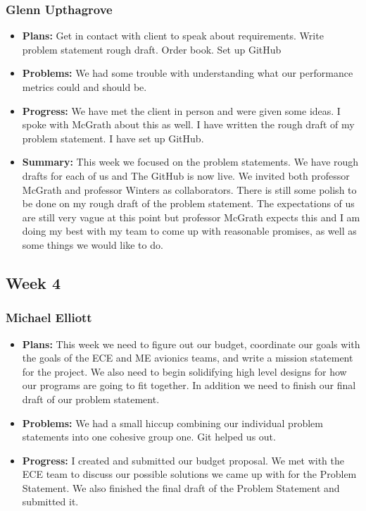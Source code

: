 \documentclass[onecolumn, draftclsnofoot,10pt, compsoc]{IEEEtran}
\begin{document}
\subsubsection{Glenn Upthagrove}
\begin {itemize}
 \item \textbf{Plans: }Get in contact with client to speak about requirements. Write problem statement rough draft. Order book. Set up GitHub
 \item \textbf{Problems: }We had some trouble with understanding what our performance metrics could and should be. 
 \item \textbf{Progress: }We have met the client in person and were given some ideas. I spoke with McGrath about this as well. I have written the rough draft of my problem statement. I have set up GitHub. 
 \item \textbf{Summary: }This week we focused on the problem statements. We have rough drafts for each of us and The GitHub is now live. We invited both professor McGrath and professor Winters as collaborators. There is still some polish to be done on my rough draft of the problem statement. The expectations of us are still very vague at this point but professor McGrath expects this and I am doing my best with my team to come up with reasonable promises, as well as some things we would like to do. 
\end {itemize}
\subsection {Week 4}
\subsubsection{Michael Elliott}
\begin {itemize}
\item \textbf{Plans: }
  This week we need to figure out our budget, coordinate our goals with the goals of the ECE and ME avionics teams, and write a mission statement for the project. We also need to begin solidifying high level designs for how our programs are going to fit together. In addition we need to finish our final draft of our problem statement.
\item \textbf{Problems: }
  We had a small hiccup combining our individual problem statements into one cohesive group one. Git helped us out.
\item \textbf{Progress: }
  I created and submitted our budget proposal. We met with the ECE team to discuss our possible solutions we came up with for the Problem Statement. We also finished the final draft of the Problem Statement and submitted it.
\end {itemize}
\end{document}
